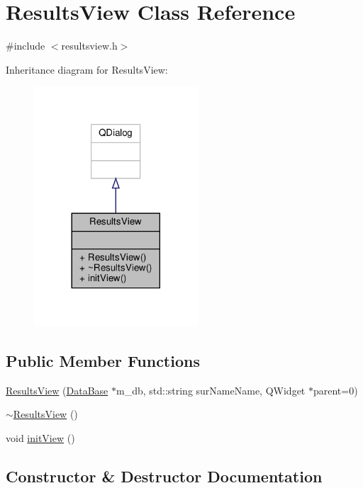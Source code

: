 \hypertarget{class_results_view}{}\section{Results\+View Class Reference}
\label{class_results_view}


{\ttfamily \#include $<$resultsview.\+h$>$}



Inheritance diagram for Results\+View\+:\nopagebreak
\begin{figure}[H]
\begin{center}
\leavevmode
\includegraphics[width=173pt]{class_results_view__inherit__graph}
\end{center}
\end{figure}
\subsection*{Public Member Functions}
\begin{DoxyCompactItemize}
\item 
\hyperlink{class_results_view_a1019cb09ad177a74227ea30e6630e4bf}{Results\+View} (\hyperlink{class_data_base}{Data\+Base} $\ast$m\+\_\+db, std\+::string sur\+Name\+Name, Q\+Widget $\ast$parent=0)
\item 
\hyperlink{class_results_view_af9caa8995848c6e05e8486ad1aac8856}{$\sim$\+Results\+View} ()
\item 
void \hyperlink{class_results_view_ad21cd6811c5b0e4d862563962fbe09d3}{init\+View} ()
\end{DoxyCompactItemize}


\subsection{Constructor \& Destructor Documentation}
\mbox{\label{class_results_view_a1019cb09ad177a74227ea30e6630e4bf}} 

